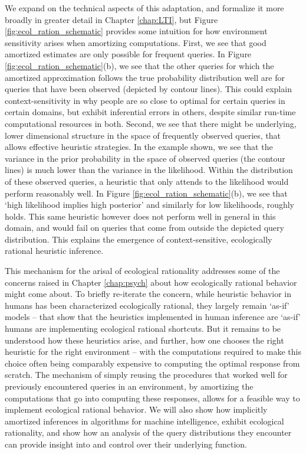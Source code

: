 We expand on the technical aspects of this adaptation, and formalize it more broadly in greater detail in Chapter \ref{chap:LTI}, but Figure \ref{fig:ecol_ration_schematic} provides some intuition for how environment sensitivity arises when amortizing computations. First, we see that good amortized estimates are only possible for frequent queries. In Figure \ref{fig:ecol_ration_schematic}(b), we see that the other queries for which the amortized approximation follows the true probability distribution well are for queries that have been observed (depicted by contour lines). This could explain context-sensitivity in why people are so close to optimal for certain queries in certain domains, but exhibit inferential errors in others, despite similar run-time computational resources in both. Second, we see that there might be underlying, lower dimensional structure in the space of frequently observed queries, that allows effective heuristic strategies. In the example shown, we see that the variance in the prior probability in the space of observed queries (the contour lines) is much lower than the variance in the likelihood. Within the distribution of these observed queries, a heuristic that only attends to the likelihood would perform reasonably well. In Figure \ref{fig:ecol_ration_schematic}(b), we see that `high likelihood implies high posterior' and similarly for low likelihoods, roughly holds. This same heuristic however does not perform well in general in this domain, and would fail on queries that come from outside the depicted query distribution. This explains the emergence of context-sensitive, ecologically rational heuristic inference.

This mechanism for the arisal of ecological rationality addresses some of the concerns raised in Chapter \ref{chap:psych} about how ecologically rational behavior might come about. To briefly re-iterate the concern, while heuristic behavior in humans has been characterized ecologically rational\cite{gigerenzer2008heuristics}, they largely remain `as-if' models -- that show that the heuristics implemented in human inference are `as-if' humans are implementing ecological rational shortcuts. But it remains to be understood how these heuristics arise, and further, how one chooses the right heuristic for the right environment -- with the computations required to make this choice often being comparably expensive to computing the optimal response from scratch\cite{hay2014selecting, horvitz1989reflection}. The mechanism of simply reusing the procedures that worked well for previously encountered queries in an environment, by amortizing the computations that go into computing these responses, allows for a feasible way to implement ecological rational behavior. We will also show how implicitly amortized inferences in algorithms for machine intelligence, exhibit ecological rationality, and show how an analysis of the query distributions they encounter can provide insight into and control over their underlying function.

